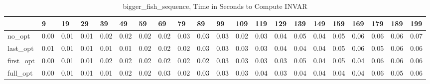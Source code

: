 \begin{table}
\caption{bigger_fish_sequence, Time in Seconds to Compute INVAR}
\label{bigger_fish_sequence_INVAR_time}
\begin{tabular}{lllllllllllllllllllll}
\toprule
 & 9 & 19 & 29 & 39 & 49 & 59 & 69 & 79 & 89 & 99 & 109 & 119 & 129 & 139 & 149 & 159 & 169 & 179 & 189 & 199 \\
\midrule
no_opt & 0.00 & 0.01 & 0.01 & 0.02 & 0.02 & 0.02 & 0.02 & 0.03 & 0.03 & 0.03 & 0.02 & 0.03 & 0.04 & 0.05 & 0.04 & 0.05 & 0.06 & 0.06 & 0.06 & 0.07 \\
last_opt & 0.01 & 0.01 & 0.01 & 0.01 & 0.01 & 0.02 & 0.02 & 0.02 & 0.03 & 0.03 & 0.03 & 0.03 & 0.04 & 0.04 & 0.04 & 0.05 & 0.06 & 0.05 & 0.06 & 0.06 \\
first_opt & 0.00 & 0.01 & 0.01 & 0.02 & 0.02 & 0.02 & 0.02 & 0.02 & 0.02 & 0.03 & 0.03 & 0.03 & 0.03 & 0.05 & 0.04 & 0.05 & 0.04 & 0.06 & 0.06 & 0.06 \\
full_opt & 0.00 & 0.01 & 0.01 & 0.01 & 0.02 & 0.02 & 0.03 & 0.02 & 0.03 & 0.03 & 0.03 & 0.04 & 0.03 & 0.04 & 0.04 & 0.04 & 0.04 & 0.06 & 0.05 & 0.06 \\
\bottomrule
\end{tabular}
\end{table}
